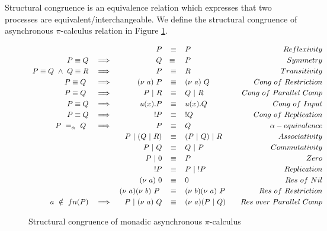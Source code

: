 \documentclass[12pt,twoside]{report}
\begin{document}
Structural congruence is an equivalence relation which expresses that two processes are equivalent/interchangeable. We define the structural congruence of asynchronous $\pi$-calculus relation in Figure \ref{picalc_cong}.\\

\begin{figure}[h]
    \centering
    \begin{equation*}
    \centering
    \begin{array}{rcrclcr}
         & & P & \equiv & P & & Reflexivity\\[2.75pt]
         P \equiv Q & \implies & Q &\equiv\ & P & & Symmetry  \\[2.75pt]
         P \equiv Q\ \land\ Q \equiv R & \implies & P & \equiv & R & & Transitivity \\[2.75pt]
         P \equiv Q\ & \implies & (\nu\ a)\ P & \equiv & (\nu\ a)\ Q & & Cong\ of\ Restriction \\[2.75pt]
         P \equiv Q\ & \implies & P\ |\ R & \equiv & Q\ |\ R & & Cong\ of\ Parallel\ Comp \\[2.75pt]
         P \equiv Q & \implies & u(x).P & \equiv & u(x).Q & & Cong\ of\ Input \\[2.75pt]
         P \equiv Q & \implies & !P & \equiv & !Q & & Cong\ of\ Replication \\[2.75pt]
         P\ =_\alpha \ Q\ & \implies & P & \equiv & Q &  & \alpha-equivalence \\[2.75pt]
         & & P\ |\ (Q\ |\ R) & \equiv & (P\ |\ Q)\ |\ R & & Associativity \\[2.75pt]
         & & P\ |\ Q & \equiv & Q\ |\ P & & Commutativity \\[2.75pt]
         & & P\ |\ 0 & \equiv & P & & Zero \\[2.75pt]
         & & !P & \equiv & P\ |\ !P & & Replication \\[2.75pt]
         & & (\nu\ a)\ 0 & \equiv & 0 & & Res\ of\ Nil \\[2.75pt]
         & & (\nu\ a)(\nu\ b)\ P\ & \equiv & (\nu\ b)(\nu\ a)\ P & & Res\ of\ Restriction \\[2.75pt]
         a\ \notin\ fn(P) & \implies & \ P\ |\ (\nu\ a)\ Q & \equiv & (\nu\ a)(P\ |\ Q) & & Res\ over\ Parallel\ Comp
        \end{array}
    \end{equation*}
    \caption{Structural congruence of monadic asynchronous  $\pi$-calculus}
    \label{picalc_cong}
\end{figure}{}
\end{document}
